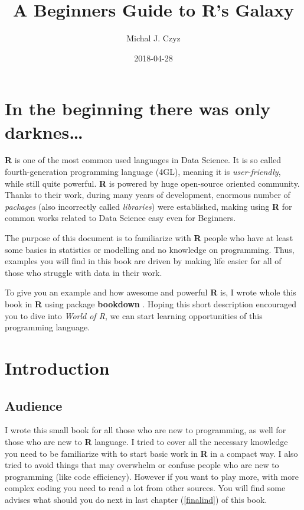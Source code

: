 \documentclass[]{book}
\title{A Beginners Guide to R's Galaxy}
\author{Michal J. Czyz}
\date{2018-04-28}
\theoremstyle{definition}
\theoremstyle{definition}
\theoremstyle{definition}
\theoremstyle{remark}
\begin{document}
\maketitle

{
\hypersetup{linkcolor=black}
\setcounter{tocdepth}{1}
\tableofcontents
}
\chapter{In the beginning there was only
darknes\ldots{}}\label{in-the-beginning-there-was-only-darknes}

\textbf{R} \citep{rcore2017} is one of the most common used languages in
Data Science. It is so called fourth-generation programming language
(4GL), meaning it is \emph{user-friendly}, while still quite powerful.
\textbf{R} is powered by huge open-source oriented community. Thanks to
their work, during many years of development, enormous number of
\emph{packages} (also incorrectly called \emph{libraries}) were
established, making using \textbf{R} for common works related to Data
Science easy even for Beginners.

The purpose of this document is to familiarize with \textbf{R} people
who have at least some basics in statistics or modelling and no
knowledge on programming. Thus, examples you will find in this book are
driven by making life easier for all of those who struggle with data in
their work.

To give you an example and how awesome and powerful \textbf{R} is, I
wrote whole this book in \textbf{R} using package \textbf{bookdown}
\citep{xie2016, R-bookdown}. Hoping this short description encouraged
you to dive into \emph{World of R}, we can start learning opportunities
of this programming language.

\chapter{Introduction}\label{intro}

\section{Audience}\label{audience}

I wrote this small book for all those who are new to programming, as
well for those who are new to \textbf{R} language. I tried to cover all
the necessary knowledge you need to be familiarize with to start basic
work in \textbf{R} in a compact way. I also tried to avoid things that
may overwhelm or confuse people who are new to programming (like code
efficiency). However if you want to play more, with more complex coding
you need to read a lot from other sources. You will find some advises
what should you do next in last chapter (\ref{finalind}) of this book.
\end{document}
